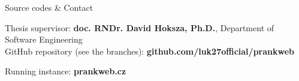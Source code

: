 \documentclass[portrait,a0paper,fontscale=0.25]{baposter}
\begin{document}
\begin{poster}

\begin{posterbox}[column=1, name=conclusion, below=result2, bottomaligned=tech]{Source codes \& Contact}


\begin{minipage}[t]{\linewidth}
	\begin{minipage}[t]{0.75\linewidth}
		Thesis supervisor: \textbf{doc. RNDr. David Hoksza, Ph.D.}, Department of Software Engineering\\

		GitHub repository (see the branches): \textbf{github.com/luk27official/prankweb}

		Running instance: \textbf{prankweb.cz}\\


\end{minipage}
\end{minipage}
\end{posterbox}
\end{poster}
\end{document}
